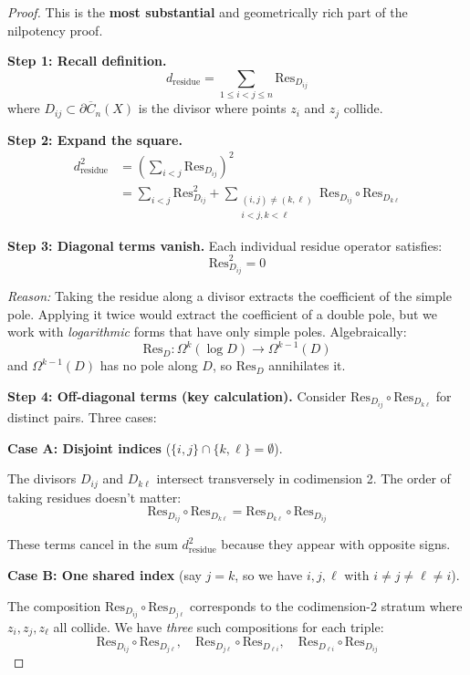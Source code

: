 \begin{proof}
This is the \textbf{most substantial} and geometrically rich part of the nilpotency proof.

\textbf{Step 1: Recall definition.}
$$d_{\text{residue}} = \sum_{1 \leq i < j \leq n} \text{Res}_{D_{ij}}$$
where $D_{ij} \subset \partial\overline{C}_n(X)$ is the divisor where points $z_i$ and
$z_j$ collide.

\textbf{Step 2: Expand the square.}
\begin{align*}
d_{\text{residue}}^2 &= \left(\sum_{i<j} \text{Res}_{D_{ij}}\right)^2\\
&= \sum_{i<j} \text{Res}_{D_{ij}}^2 + \sum_{\substack{(i,j) \neq (k,\ell)\\i<j, k<\ell}} 
\text{Res}_{D_{ij}} \circ \text{Res}_{D_{k\ell}}
\end{align*}

\textbf{Step 3: Diagonal terms vanish.}
Each individual residue operator satisfies:
$$\text{Res}_{D_{ij}}^2 = 0$$

\emph{Reason:} Taking the residue along a divisor extracts the coefficient of the simple
pole. Applying it twice would extract the coefficient of a double pole, but we work with
\emph{logarithmic} forms that have only simple poles. Algebraically:
$$\text{Res}_{D}: \Omega^k(\log D) \to \Omega^{k-1}(D)$$
and $\Omega^{k-1}(D)$ has no pole along $D$, so $\text{Res}_D$ annihilates it.

\textbf{Step 4: Off-diagonal terms (key calculation).}
Consider $\text{Res}_{D_{ij}} \circ \text{Res}_{D_{k\ell}}$ for distinct pairs. Three cases:

\textbf{Case A: Disjoint indices} ($\{i,j\} \cap \{k,\ell\} = \emptyset$).

The divisors $D_{ij}$ and $D_{k\ell}$ intersect transversely in codimension 2. The order
of taking residues doesn't matter:
$$\text{Res}_{D_{ij}} \circ \text{Res}_{D_{k\ell}} = \text{Res}_{D_{k\ell}} \circ 
\text{Res}_{D_{ij}}$$

These terms cancel in the sum $d_{\text{residue}}^2$ because they appear with opposite signs.

\textbf{Case B: One shared index} (say $j = k$, so we have $i, j, \ell$ with $i \neq j \neq \ell \neq i$).

The composition $\text{Res}_{D_{ij}} \circ \text{Res}_{D_{j\ell}}$ corresponds to the
codimension-2 stratum where $z_i, z_j, z_\ell$ all collide. We have \emph{three} such
compositions for each triple:
$$\text{Res}_{D_{ij}} \circ \text{Res}_{D_{j\ell}}, \quad 
\text{Res}_{D_{j\ell}} \circ \text{Res}_{D_{\ell i}}, \quad 
\text{Res}_{D_{\ell i}} \circ \text{Res}_{D_{ij}}$$


\end{proof}
